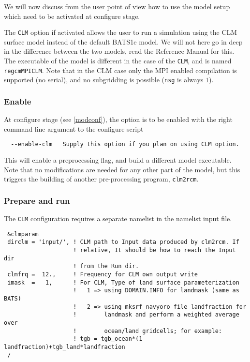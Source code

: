 We will now discuss from the user point of view how to use the model
setup which need to be activated at configure stage.

The \verb=CLM= option if activated allows the user to run a simulation using
the CLM surface model instead of the default BATS1e model. We will not here go
in deep in the difference between the two models, read the Reference Manual
for this.
The executable of the model is different in the case of the \verb=CLM=, and is
named \verb=regcmMPICLM=.
Note that in the CLM case only the MPI enabled compilation is supported (no
serial), and no subgridding is possible (\verb=nsg= is always $1$).

\subsubsection{Enable}

At configure stage (see \ref{modconf}), the option is to be enabled with the
right command line argument to the configure script

\begin{Verbatim}
  --enable-clm   Supply this option if you plan on using CLM option.
\end{Verbatim}

This will enable a preprocessing flag, and build a different model executable.
Note that no modifications are needed for any other part of the model, but
this triggers the building of another pre-processing program, \verb=clm2rcm=.

\subsubsection{Prepare and run}
\label{clmrun}

The \verb=CLM= configuration requires a separate namelist in the namelist input
file.

{\footnotesize
\begin{Verbatim}
 &clmparam
 dirclm = 'input/', ! CLM path to Input data produced by clm2rcm. If 
                    ! relative, It should be how to reach the Input dir
                    ! from the Run dir.
 clmfrq =  12.,     ! Frequency for CLM own output write
 imask  =   1,      ! For CLM, Type of land surface parameterization
                    !   1 => using DOMAIN.INFO for landmask (same as BATS)
                    !   2 => using mksrf_navyoro file landfraction for
                    !        landmask and perform a weighted average over
                    !        ocean/land gridcells; for example:
                    ! tgb = tgb_ocean*(1-landfraction)+tgb_land*landfraction
 /
\end{Verbatim}
}

